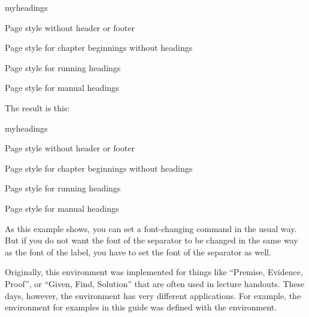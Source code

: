   \begin{Example}
\begin{lstcode}
  \begin{labeling}[~--]{myheadings}
    \item[empty]
      Page style without header or footer
    \item[plain]
      Page style for chapter beginnings without headings
    \item[headings]
      Page style for running headings
    \item[myheadings]
      Page style for manual headings
  \end{labeling}
\end{lstcode}
    The result is this:
    \begin{ShowOutput}
      \begin{labeling}[~--]{myheadings}
      \item[empty]
        Page style without header or footer
      \item[plain]
        Page style for chapter beginnings without headings
      \item[headings]
        Page style for running headings
      \item[myheadings]
        Page style for manual headings
      \end{labeling}
    \end{ShowOutput}
    As this example shows, you can set a font-changing command in the usual
    way. But if you do not want the font of the separator to be changed in the
    same way as the font of the label, you have to set the font of the
    separator as well.
  \end{Example}
\fi%
\EndIndexGroup
Originally, this environment was implemented for things like ``Premise,
Evidence, Proof'', or ``Given, Find, Solution'' that are often used in
lecture handouts.  These days, however, the environment has very different
applications. For example, the environment for examples in this guide was
defined with the  environment.%
%
\EndIndexGroup


